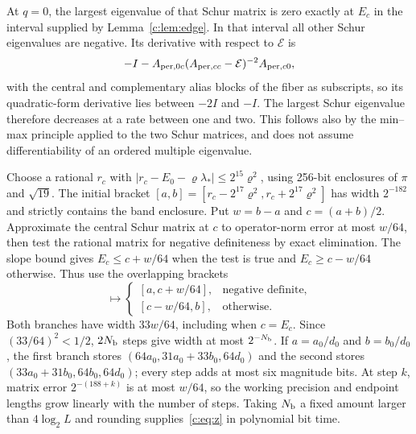 At $q=0$, the largest eigenvalue of that Schur matrix is zero exactly
at $E_c$ in the interval supplied by Lemma~\ref{c:lem:edge}. In that
interval all other Schur eigenvalues are negative. Its derivative
with respect to $\mathcal E$ is
\[
 -I-A_{{\rm per},0c}(A_{{\rm per},cc}-\mathcal E)^{-2}A_{{\rm per},c0},
\]
with the central and complementary alias blocks of the fiber as subscripts,
so its quadratic-form derivative lies between $-2I$ and $-I$.
The largest Schur eigenvalue therefore decreases at a rate between
one and two. This follows also by the min--max principle applied to
the two Schur matrices, and does not assume differentiability of an
ordered multiple eigenvalue.

Choose a rational $r_c$ with
$|r_c-E_0-\varrho\lambda_*|\le2^{15}\varrho^2$, using 256-bit
enclosures of $\pi$ and $\sqrt{19}$. The initial bracket
$[a,b]=[r_c-2^{17}\varrho^2,r_c+2^{17}\varrho^2]$ has width
$2^{-182}$ and strictly contains the band enclosure.
Put $w=b-a$ and $c=(a+b)/2$. Approximate the central Schur
matrix at $c$ to operator-norm error at most $w/64$, then test the
rational matrix for negative definiteness by exact elimination.
The slope bound gives $E_c\le c+w/64$ when the test is true and
$E_c\ge c-w/64$ otherwise. Thus use the overlapping brackets
\begin{equation}
 [a,b]\longmapsto
 \begin{cases}
 [a,c+w/64],&\text{negative definite},\\
 [c-w/64,b],&\text{otherwise}.
 \end{cases}                                             \label{c:eq:edge-bracket-step}
\end{equation}
Both branches have width $33w/64$, including when $c=E_c$.
Since $(33/64)^2<1/2$, $2N_{\rm b}$ steps give width at most
$2^{-N_{\rm b}}$. If $a=a_0/d_0$ and $b=b_0/d_0$, the first branch stores
$(64a_0,31a_0+33b_0,64d_0)$ and the second stores
$(33a_0+31b_0,64b_0,64d_0)$; every step adds at most six magnitude bits.
At step $k$, matrix error $2^{-(188+k)}$ is at most $w/64$, so the
working precision and endpoint lengths grow linearly with the number
of steps. Taking $N_{\rm b}$ a fixed amount larger than
$4\log_2L$ and rounding supplies~\eqref{c:eq:z} in polynomial bit time.

